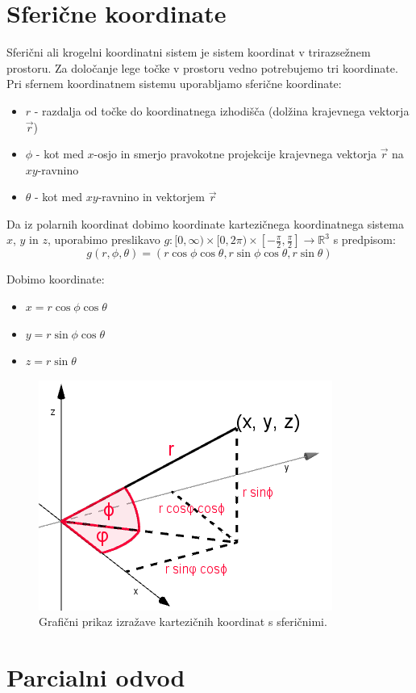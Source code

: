 \documentclass[12pt, a4paper]{article}
\begin{document}
\section{Sferične koordinate}

Sferični ali krogelni koordinatni sistem je sistem koordinat v trirazsežnem prostoru. Za določanje lege točke v prostoru vedno potrebujemo tri koordinate. Pri sfernem koordinatnem sistemu uporabljamo sferične koordinate:
\begin{itemize}
\item $r$ - razdalja od točke do koordinatnega izhodišča (dolžina krajevnega vektorja $\vec{r}$)
\item $\phi$ - kot med $x$-osjo in smerjo pravokotne projekcije krajevnega vektorja $\vec{r}$ na $xy$-ravnino
\item $\theta$ - kot med $xy$-ravnino in vektorjem $\vec{r}$
\end{itemize}

Da iz polarnih koordinat dobimo koordinate kartezičnega koordinatnega sistema $x$, $y$ in $z$, uporabimo preslikavo $g:  [ 0,\infty) \times   [0,2\pi) \times   [-\frac{\pi}{2}, \frac{\pi}{2}]  \rightarrow \mathbb{R}^3 $ s predpisom:
$$g(r,\phi, \theta) = (r \cos \phi \cos \theta, r \sin \phi \cos \theta, r \sin \theta)$$

Dobimo koordinate:
\begin{itemize}
\item $x=r \cos \phi \cos \theta$
\item $y=r \sin \phi  \cos \theta $
\item $z=r \sin \theta$
\end{itemize}

\begin{figure}[h!]
\centering
\includegraphics[width=.37\textwidth]{sfericne.png}
\caption{Grafični prikaz izražave kartezičnih koordinat s sferičnimi.}
\end{figure}


\section{Parcialni odvod}
\end{document}

